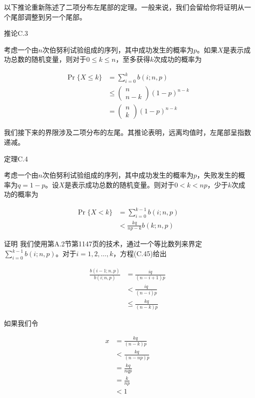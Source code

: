 \documentclass[lang=cn,newtx,10pt,scheme=chinese]{elegantbook}
\begin{document}
以下推论重新陈述了二项分布左尾部的定理。一般来说，我们会留给你将证明从一个尾部调整到另一个尾部。

推论C.3

考虑一个由$n$次伯努利试验组成的序列，其中成功发生的概率为$p$。如果$X$是表示成功总数的随机变量，则对于$0 \leq k \leq n$，至多获得$k$次成功的概率为

$$
\begin{aligned}
\operatorname{Pr}\{X \leq k\} & =\sum_{i=0}^k b(i ; n, p) \\
& \leq(\begin{array}{c}
n \\
n-k
\end{array})(1-p)^{n-k} \\
& =(\begin{array}{l}
n \\
k
\end{array})(1-p)^{n-k}
\end{aligned}
$$

我们接下来的界限涉及二项分布的左尾。其推论表明，远离均值时，左尾部呈指数递减。

定理C.4

考虑一个由$n$次伯努利试验组成的序列，其中成功发生的概率为$p$，失败发生的概率为$q=1-p$。设$X$是表示成功总数的随机变量。则对于$0<k<n p$，少于$k$次成功的概率为

$$
\begin{aligned}
\operatorname{Pr}\{X<k\} & =\sum_{i=0}^{k-1} b(i ; n, p) \\
& <\frac{k q}{n p-k} b(k ; n, p)
\end{aligned}
$$

证明 我们使用第A.2节第1147页的技术，通过一个等比数列来界定$\sum_{i=0}^{k-1} b(i ; n, p)$。对于$i=1,2, \ldots, k$，方程(C.45)给出

$$
\begin{aligned}
\frac{b(i-1 ; n, p)}{b(i ; n, p)} & =\frac{i q}{(n-i+1) p} \\
& <\frac{i q}{(n-i) p} \\
& \leq \frac{k q}{(n-k) p}
\end{aligned}
$$

如果我们令

$$
\begin{aligned}
x & =\frac{k q}{(n-k) p} \\
& <\frac{k q}{(n-n p) p} \\
& =\frac{k q}{n q p} \\
& =\frac{k}{n p} \\
& <1
\end{aligned}
$$
\end{document}
